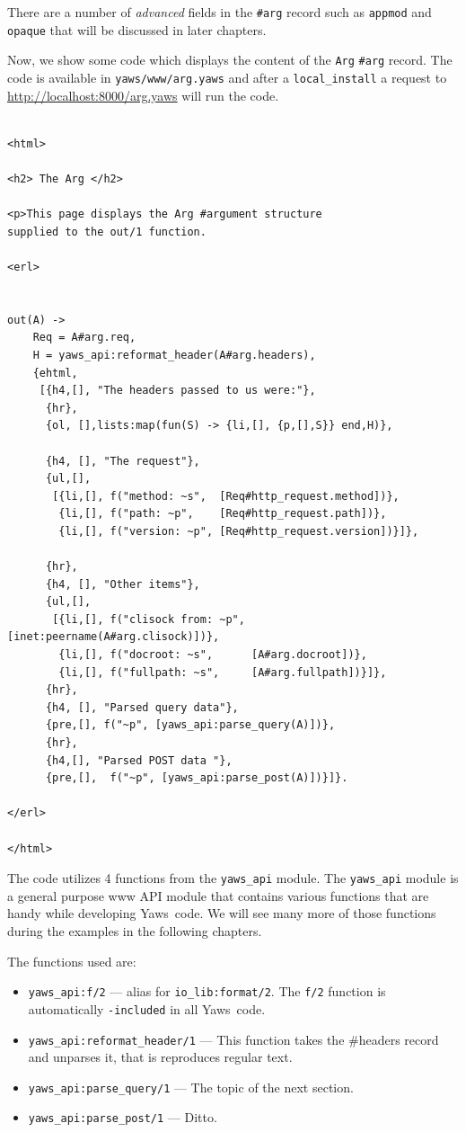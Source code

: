 \documentclass[11pt,oneside,english]{book}
\newcommand{\Yaws}            %
        {{\sc Yaws}}
\begin{document}
There are a number of \textit{advanced} fields in the \verb+#arg+
record such as \verb+appmod+ and \verb+opaque+ that will be discussed
in later chapters.

Now, we show some code which displays the content of the \verb+Arg+
\verb+#arg+ record.  The code is available in \verb+yaws/www/arg.yaws+
and after a \verb+local_install+ a request to
\url{http://localhost:8000/arg.yaws} will run the code.

\begin{verbatim}

<html>

<h2> The Arg </h2>

<p>This page displays the Arg #argument structure
supplied to the out/1 function.

<erl>


out(A) ->
    Req = A#arg.req,
    H = yaws_api:reformat_header(A#arg.headers),
    {ehtml,
     [{h4,[], "The headers passed to us were:"},
      {hr},
      {ol, [],lists:map(fun(S) -> {li,[], {p,[],S}} end,H)},

      {h4, [], "The request"},
      {ul,[],
       [{li,[], f("method: ~s",  [Req#http_request.method])},
        {li,[], f("path: ~p",    [Req#http_request.path])},
        {li,[], f("version: ~p", [Req#http_request.version])}]},

      {hr},
      {h4, [], "Other items"},
      {ul,[],
       [{li,[], f("clisock from: ~p", [inet:peername(A#arg.clisock)])},
        {li,[], f("docroot: ~s",      [A#arg.docroot])},
        {li,[], f("fullpath: ~s",     [A#arg.fullpath])}]},
      {hr},
      {h4, [], "Parsed query data"},
      {pre,[], f("~p", [yaws_api:parse_query(A)])},
      {hr},
      {h4,[], "Parsed POST data "},
      {pre,[],  f("~p", [yaws_api:parse_post(A)])}]}.

</erl>

</html>

\end{verbatim}

The code utilizes 4 functions from the \verb+yaws_api+ module.  The
\verb+yaws_api+ module is a general purpose www API module that
contains various functions that are handy while developing
\Yaws\ code. We will see many more of those functions during the
examples in the following chapters.

The functions used are:

\begin{itemize}
\item \verb+yaws_api:f/2+ --- alias for \verb+io_lib:format/2+. The
  \verb+f/2+ function is automatically \verb+-included+ in all
  \Yaws\ code.
\item \verb+yaws_api:reformat_header/1+ --- This function takes the
  \#headers record and unparses it, that is reproduces regular text.
\item \verb+yaws_api:parse_query/1+ --- The topic of the next section.
\item \verb+yaws_api:parse_post/1+ --- Ditto.
\end{itemize}
\end{document}

